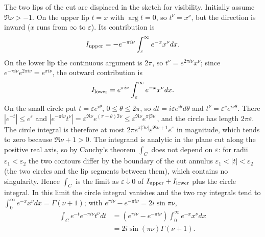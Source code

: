 \begin{center}
\end{center}
The two lips of the cut are displaced in the sketch for visibility.
Initially assume $\Re\nu>-1$.  On the upper lip $t=x$ with
$\arg t=0$, so $t^\nu=x^\nu$, but the direction is inward ($x$ runs
from $\infty$ to $\varepsilon$).  Its contribution is
\[
I_{\rm upper}=-e^{-\pi i\nu}
\int_\varepsilon^\infty e^{-x}x^\nu dx.
\]
On the lower lip the continuous argument is $2\pi$, so
$t^\nu=e^{2\pi i\nu}x^\nu$; since $e^{-\pi i\nu}e^{2\pi i\nu}
=e^{\pi i\nu}$, the outward contribution is
\[
I_{\rm lower}=e^{\pi i\nu}
\int_\varepsilon^\infty e^{-x}x^\nu dx.
\]
On the small circle put $t=\varepsilon e^{i\theta}$,
$0\le\theta\le2\pi$, so $dt=i\varepsilon e^{i\theta}d\theta$ and
$t^\nu=\varepsilon^\nu e^{i\nu\theta}$.  There $|e^{-t}|\le
e^\varepsilon$ and
$|e^{-\pi i\nu}t^\nu|=\varepsilon^{\Re\nu}e^{(\pi-\theta)\Im\nu}
\le\varepsilon^{\Re\nu}e^{\pi|\Im\nu|}$, and the circle has length
$2\pi\varepsilon$.  The circle integral is therefore at most
$2\pi e^{\pi|\Im\nu|}\varepsilon^{\Re\nu+1}e^\varepsilon$ in
magnitude, which tends to zero because $\Re\nu+1>0$.
The integrand is analytic in the plane cut along the positive real
axis, so by Cauchy's theorem $\int_C$ does not depend on
$\varepsilon$: for radii $\varepsilon_1<\varepsilon_2$ the two
contours differ by the boundary of the cut annulus
$\varepsilon_1<|t|<\varepsilon_2$ (the two circles and the lip
segments between them), which contains no singularity.  Hence
$\int_C$ is the limit as $\varepsilon\downarrow0$ of
$I_{\rm upper}+I_{\rm lower}$ plus the circle integral.  In this
limit the circle integral vanishes and the two ray integrals tend to
$\int_0^\infty e^{-x}x^\nu dx=\Gamma(\nu+1)$; with
$e^{\pi i\nu}-e^{-\pi i\nu}=2i\sin\pi\nu$,
\begin{align*}
\int_C e^{-t}e^{-\pi i\nu}t^\nu dt
&=(e^{\pi i\nu}-e^{-\pi i\nu})
 \int_0^\infty e^{-x}x^\nu dx\\
&=\boxed{2i\sin(\pi\nu)\Gamma(\nu+1)}.
\end{align*}


